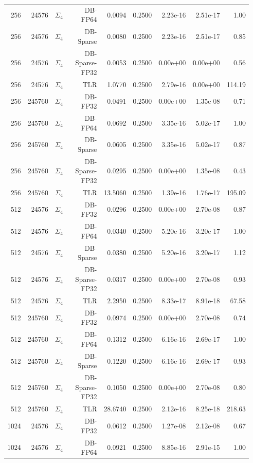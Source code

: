 \begin{tabular}{|r|r|r|r|r|r|r|r|r|}
  256 & 24576 & $\Sigma_4$ & DB-FP64 & 0.0094 & 0.2500 & 2.23e-16 & 2.51e-17 & 1.00 \\
  256 & 24576 & $\Sigma_4$ & DB-Sparse & 0.0080 & 0.2500 & 2.23e-16 & 2.51e-17 & 0.85 \\
  256 & 24576 & $\Sigma_4$ & DB-Sparse-FP32 & 0.0053 & 0.2500 & 0.00e+00 & 0.00e+00 & 0.56 \\
  256 & 24576 & $\Sigma_4$ & TLR & 1.0770 & 0.2500 & 2.79e-16 & 0.00e+00 & 114.19 \\
  256 & 245760 & $\Sigma_4$ & DB-FP32 & 0.0491 & 0.2500 & 0.00e+00 & 1.35e-08 & 0.71 \\
  256 & 245760 & $\Sigma_4$ & DB-FP64 & 0.0692 & 0.2500 & 3.35e-16 & 5.02e-17 & 1.00 \\
  256 & 245760 & $\Sigma_4$ & DB-Sparse & 0.0605 & 0.2500 & 3.35e-16 & 5.02e-17 & 0.87 \\
  256 & 245760 & $\Sigma_4$ & DB-Sparse-FP32 & 0.0295 & 0.2500 & 0.00e+00 & 1.35e-08 & 0.43 \\
  256 & 245760 & $\Sigma_4$ & TLR & 13.5060 & 0.2500 & 1.39e-16 & 1.76e-17 & 195.09 \\
  512 & 24576 & $\Sigma_4$ & DB-FP32 & 0.0296 & 0.2500 & 0.00e+00 & 2.70e-08 & 0.87 \\
  512 & 24576 & $\Sigma_4$ & DB-FP64 & 0.0340 & 0.2500 & 5.20e-16 & 3.20e-17 & 1.00 \\
  512 & 24576 & $\Sigma_4$ & DB-Sparse & 0.0380 & 0.2500 & 5.20e-16 & 3.20e-17 & 1.12 \\
  512 & 24576 & $\Sigma_4$ & DB-Sparse-FP32 & 0.0317 & 0.2500 & 0.00e+00 & 2.70e-08 & 0.93 \\
  512 & 24576 & $\Sigma_4$ & TLR & 2.2950 & 0.2500 & 8.33e-17 & 8.91e-18 & 67.58 \\
  512 & 245760 & $\Sigma_4$ & DB-FP32 & 0.0974 & 0.2500 & 0.00e+00 & 2.70e-08 & 0.74 \\
  512 & 245760 & $\Sigma_4$ & DB-FP64 & 0.1312 & 0.2500 & 6.16e-16 & 2.69e-17 & 1.00 \\
  512 & 245760 & $\Sigma_4$ & DB-Sparse & 0.1220 & 0.2500 & 6.16e-16 & 2.69e-17 & 0.93 \\
  512 & 245760 & $\Sigma_4$ & DB-Sparse-FP32 & 0.1050 & 0.2500 & 0.00e+00 & 2.70e-08 & 0.80 \\
  512 & 245760 & $\Sigma_4$ & TLR & 28.6740 & 0.2500 & 2.12e-16 & 8.25e-18 & 218.63 \\
  1024 & 24576 & $\Sigma_4$ & DB-FP32 & 0.0612 & 0.2500 & 1.27e-08 & 2.12e-08 & 0.67 \\
  1024 & 24576 & $\Sigma_4$ & DB-FP64 & 0.0921 & 0.2500 & 8.85e-16 & 2.91e-15 & 1.00 \\

\end{tabular}
